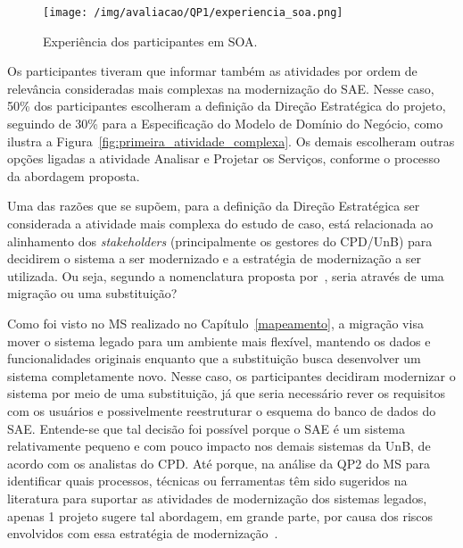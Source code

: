 
\begin{figure}[htb]
\centering
\texttt{[image: /img/avaliacao/QP1/experiencia\_soa.png]}
\caption{Experiência dos participantes em \acrshort{SOA}.}
\label{fig:experiencia_soa}
\end{figure}
\FloatBarrier

Os participantes tiveram que informar também as atividades por ordem de relevância consideradas mais complexas na modernização do \acrshort{SAE}. Nesse caso, 50\% dos participantes escolheram a definição da Direção Estratégica do projeto, seguindo de 30\% para a Especificação do Modelo de Domínio do Negócio, como ilustra a Figura~\ref{fig:primeira_atividade_complexa}. Os demais escolheram outras opções ligadas a atividade Analisar e Projetar os Serviços, conforme o processo da abordagem proposta. 

Uma das razões que se supõem, para a definição da Direção Estratégica ser considerada a atividade mais complexa do estudo de caso, está relacionada ao alinhamento dos \textit{stakeholders} (principalmente os gestores do CPD/UnB) para decidirem o sistema a ser modernizado e a estratégia de modernização a ser utilizada. Ou seja, segundo a nomenclatura proposta por~\cite{S3_Bisbal:1999}, seria através de uma migração ou uma substituição? 

Como foi visto no \acrshort{MS} realizado no Capítulo~\ref{mapeamento}, a migração visa mover o sistema legado para um ambiente mais flexível, mantendo os dados e funcionalidades originais enquanto que a substituição busca desenvolver um sistema completamente novo. Nesse caso, os participantes decidiram modernizar o sistema por meio de uma substituição, já que seria necessário rever os requisitos com os usuários e possivelmente reestruturar o esquema do banco de dados do \acrshort{SAE}. Entende-se que tal decisão foi possível porque o \acrshort{SAE} é um sistema relativamente pequeno e com pouco impacto nos demais sistemas da UnB, de acordo com os analistas do CPD. Até porque, na análise da QP2 do \acrshort{MS} para identificar quais processos, técnicas ou ferramentas têm sido sugeridos na literatura para suportar as atividades de modernização dos sistemas legados, apenas 1 projeto sugere tal abordagem, em grande parte, por causa dos riscos envolvidos com essa estratégia de modernização~\cite{S3_Bisbal:1999, Comella-DordaASurvey2000, Salvatierra:2013}. 

